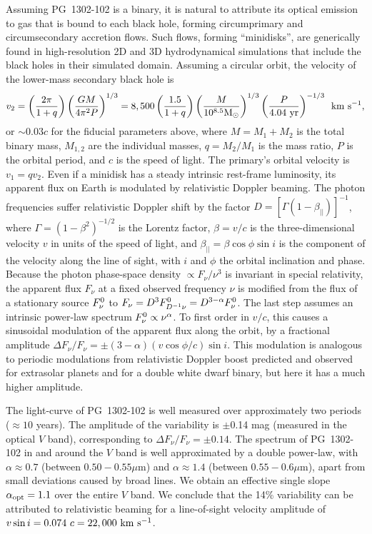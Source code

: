 Assuming PG~1302-102 is a binary, it is natural to attribute its
optical emission to gas that is bound to each black hole, forming
circumprimary and circumsecondary accretion flows. Such flows, forming
``minidisks'', are generically found in high-resolution 2D and 3D
hydrodynamical simulations that include the black holes in their
simulated
domain\cite{Hayasaki+2008,ShiKrolik2012,Roedig+2012,Dorazio+2013,Nixon+2013,Farris+2014,Dunhill+2015,ShiKrolik2015}.
Assuming a circular orbit, the velocity of the lower-mass secondary
black hole is
\begin{equation}
\nonumber
v_2= \left(\frac{2\pi}{1+q}\right) \left(\frac{GM}{4\pi^2P}\right)^{1/3} 
=8,500 
\left(\frac{1.5}{1+q}\right) 
\left(\frac{M}{10^{8.5}{\rm M_\odot}}\right)^{1/3}
\left(\frac{P}{4.04~{\rm yr}}\right)^{-1/3} \,\,\, {\rm km~s^{-1}},
\end{equation}
or $\sim 0.03c$ for the fiducial parameters above, where $M=M_1+M_2$
is the total binary mass, $M_{1,2}$ are the individual masses,
$q=M_2/M_1$ is the mass ratio, $P$ is the orbital period, and $c$ is
the speed of light.  The primary's orbital velocity is $v_1=qv_2$.
Even if a minidisk has a steady intrinsic rest-frame luminosity, its
apparent flux on Earth is modulated by relativistic Doppler beaming.
The photon frequencies suffer relativistic Doppler shift by the factor
$D=[\Gamma(1-\beta_{||})]^{-1}$, where $\Gamma=(1-\beta^2)^{-1/2}$ is
the Lorentz factor, $\beta=v/c$ is the three-dimensional velocity $v$
in units of the speed of light, and $\beta_{||}=\beta\cos\phi\sin i$
is the component of the velocity along the line of sight, with $i$ and
$\phi$ the orbital inclination and phase.  Because the photon
phase-space density $\propto F_\nu / \nu^3$ is invariant in special
relativity, the apparent flux $F_\nu$ at a fixed observed frequency
$\nu$ is modified from the flux of a stationary source $F_\nu^{\rm 0}$
to $F_\nu =D^{3}F^{\rm 0}_{D^{-1}\nu}=D^{3-\alpha}F^{\rm 0}_{\nu}$.
The last step assumes an intrinsic power-law spectrum $F^{\rm
  0}_{\nu}\propto \nu^{\alpha}$.  To first order in $v/c$, this causes
a sinusoidal modulation of the apparent flux along the orbit, by a
fractional amplitude $\Delta F_\nu/F_\nu = \pm
(3-\alpha)(v\cos\phi/c)\sin i$.  This modulation is analogous to
periodic modulations from relativistic Doppler boost
predicted\cite{LoebGaudi2003} and observed for extrasolar
planets\cite{Kerkwijk+2010,MH2010} and for a double white dwarf
binary\cite{Shporer+2010}, but here it has a much higher amplitude.


The light-curve of PG~1302-102 is well measured over approximately two
periods ($\approx 10$ years).  The amplitude of the variability is
$\pm$0.14 mag (measured in the optical $V$
band\cite{Djorgovski+2010}), corresponding to $\Delta
F_\nu/F_\nu=\pm0.14$.  The spectrum of PG~1302-102 in and around the
$V$ band is well approximated by a double power-law, with
$\alpha\approx 0.7$ (between $0.50-0.55\mu$m) and $\alpha\approx 1.4$
(between $0.55-0.6\mu$m), apart from small deviations caused by broad
lines.  We obtain an effective single slope $\alpha_{\rm opt}=1.1$
over the entire $V$ band.  We conclude that the 14\% variability can
be attributed to relativistic beaming for a line-of-sight velocity
amplitude of $v\sin i=0.074~c=22,000~{\rm km~s^{-1}}$.

